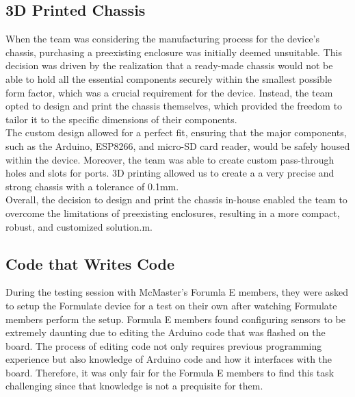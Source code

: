 \documentclass[12pt]{article}
\begin{document}
\subsection{3D Printed Chassis}
When the team was considering the manufacturing process for the device's chassis, purchasing a preexisting enclosure was initially deemed unsuitable. This decision was driven by the realization that a ready-made chassis would not be able to hold all the essential components securely within the smallest possible form factor, which was a crucial requirement for the device. Instead, the team opted to design and print the chassis themselves, which provided the freedom to tailor it to the specific dimensions of their components.\\

The custom design allowed for a perfect fit, ensuring that the major components, such as the Arduino, ESP8266, and micro-SD card reader, would be safely housed within the device. Moreover, the team was able to create custom pass-through holes and slots for ports. 3D printing allowed us to create a a very precise and strong chassis with a tolerance of 0.1mm.\\

Overall, the decision to design and print the chassis in-house enabled the team to overcome the limitations of preexisting enclosures, resulting in a more compact, robust, and customized solution.m.

\subsection{Code that Writes Code}
During the testing session with McMaster's Forumla E members, they were asked to setup the Formulate device for a test on their own after watching Formulate
members perform the setup. Formula E members found configuring sensors to be extremely daunting due to editing the Arduino code that was flashed on the board.
The process of editing code not only requires previous programming experience but also knowledge of Arduino code and how it interfaces with the board. Therefore,
it was only fair for the Formula E members to find this task challenging since that knowledge is not a prequisite for them. \\
\end{document}
